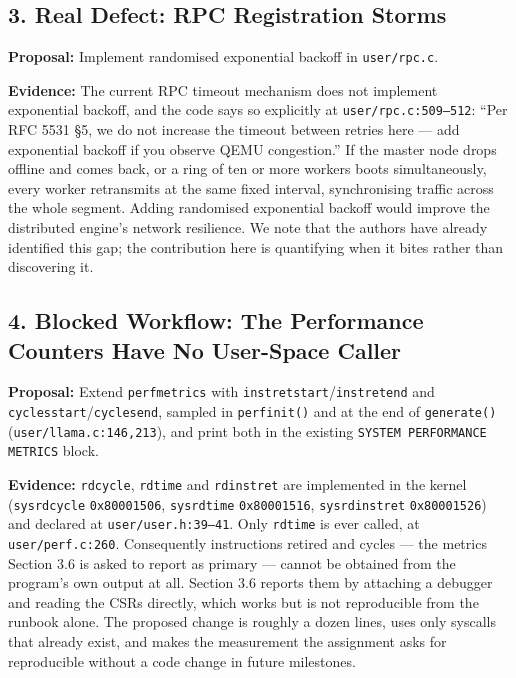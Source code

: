 \documentclass[11pt]{article}
\renewcommand{\_}{\origunderscore\allowbreak}
\begin{document}
\subsection*{3. Real Defect: RPC Registration Storms}
\textbf{Proposal:} Implement randomised exponential backoff in \texttt{user/rpc.c}.

\textbf{Evidence:} The current RPC timeout mechanism does not implement exponential backoff, and the code says so explicitly at \texttt{user/rpc.c:509--512}: ``Per RFC 5531 \S5, we do not increase the timeout between retries here --- add exponential backoff if you observe QEMU congestion.'' If the master node drops offline and comes back, or a ring of ten or more workers boots simultaneously, every worker retransmits at the same fixed interval, synchronising traffic across the whole segment. Adding randomised exponential backoff would improve the distributed engine's network resilience. We note that the authors have already identified this gap; the contribution here is quantifying when it bites rather than discovering it.

\subsection*{4. Blocked Workflow: The Performance Counters Have No User-Space Caller}
\textbf{Proposal:} Extend \texttt{perf\_metrics} with \texttt{instret\_start}/\texttt{instret\_end} and \texttt{cycles\_start}/\texttt{cycles\_end}, sampled in \texttt{perf\_init()} and at the end of \texttt{generate()} (\texttt{user/\allowbreak{}llama.c:146,213}), and print both in the existing \texttt{SYSTEM PERFORMANCE METRICS} block.

\textbf{Evidence:} \texttt{rdcycle}, \texttt{rdtime} and \texttt{rdinstret} are implemented in the kernel (\texttt{sys\_rdcycle} \texttt{0x80001506}, \texttt{sys\_rdtime} \texttt{0x80001516}, \texttt{sys\_rdinstret} \texttt{0x80001526}) and declared at \texttt{user/\allowbreak{}user.h:39--41}. Only \texttt{rdtime} is ever called, at \texttt{user/\allowbreak{}perf.c:260}. Consequently instructions retired and cycles --- the metrics Section 3.6 is asked to report as primary --- cannot be obtained from the program's own output at all. Section 3.6 reports them by attaching a debugger and reading the CSRs directly, which works but is not reproducible from the runbook alone. The proposed change is roughly a dozen lines, uses only syscalls that already exist, and makes the measurement the assignment asks for reproducible without a code change in future milestones.
\end{document}
